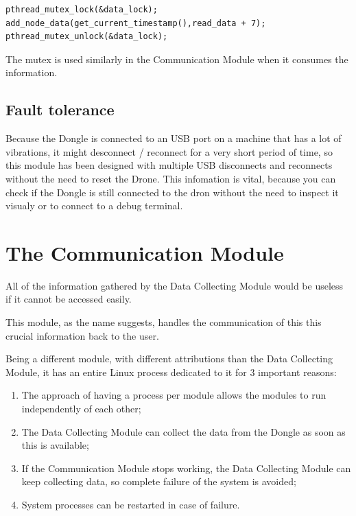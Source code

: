 \lstset{numbers=none, mathescape=true, nolol=false,caption=Data Collection use of mutex,label=lst:task}
\begin{lstlisting}
pthread_mutex_lock(&data_lock);
add_node_data(get_current_timestamp(),read_data + 7);
pthread_mutex_unlock(&data_lock);
\end{lstlisting}

The mutex is used similarly in the Communication Module when it consumes the information.


\subsection{Fault tolerance}

Because the Dongle is connected to an USB port on a machine that has a lot of vibrations, it might desconnect / reconnect for a very short period of time, so this module has been designed  with multiple USB disconnects and reconnects without the need to reset the Drone. This infomation is vital, because you can check if the Dongle is still connected to the dron without the need to inspect it visualy or to connect to a debug terminal.

\section{The Communication Module}

All of the information gathered by the Data Collecting Module would be useless if it cannot be accessed easily.

This module, as the name suggests, handles the communication of this this crucial information back to the user.

Being a different module, with different attributions than the Data Collecting Module, it has an entire Linux process dedicated to it for 3 important reasons:
\begin{enumerate}

\item The approach of having a process per module allows the modules to run independently of each other;
\item The Data Collecting Module can collect the data from the Dongle as soon as this is available;
\item If the Communication Module stops working, the Data Collecting Module can keep collecting data, so complete failure of the system is avoided;
\item System processes can be restarted in case of failure.

\end{enumerate}

